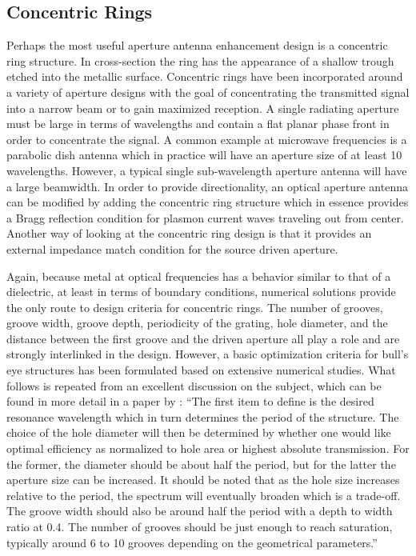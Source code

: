 \documentclass[11pt]{article}
\begin{document}
\subsection{Concentric Rings}
%
Perhaps the most useful aperture antenna enhancement design is a concentric ring structure. In cross-section the ring has the appearance of a shallow trough etched into the metallic surface. Concentric rings have been incorporated around a variety of aperture designs with the goal of concentrating the transmitted signal into a narrow beam or to gain maximized reception. A single radiating aperture must be large in terms of wavelengths and contain a flat planar phase front in order to concentrate the signal. A common example at microwave frequencies is a parabolic dish antenna which in practice will have an aperture size of at least 10 wavelengths. However, a typical single sub-wavelength aperture antenna will have a large beamwidth. In order to provide directionality, an optical aperture antenna can be modified by adding the concentric ring structure which in essence provides a Bragg reflection condition for plasmon current waves traveling out from center. Another way of looking at the concentric ring design is that it provides an external impedance match condition for the source driven aperture.

Again, because metal at optical frequencies has a behavior similar to that of a dielectric, at least in terms of boundary conditions, numerical solutions provide the only route to design criteria for concentric rings. The number of grooves, groove width, groove depth, periodicity of the grating, hole diameter, and the distance between the first groove and the driven aperture all play a role and are strongly interlinked in the design. However, a basic optimization criteria for bull's eye structures has been formulated based on extensive numerical studies. What follows is repeated from an excellent discussion on the subject, which can be found in more detail in a paper by \cite{Mahboub2010}: ``The first item to define is the desired resonance wavelength which in turn determines the period of the structure. The choice of the hole diameter will then be determined by whether one would like optimal efficiency as normalized to hole area or highest absolute transmission. For the former, the diameter should be about half the period, but for the latter the aperture size can be increased. It should be noted that as the hole size increases relative to the period, the spectrum will eventually broaden which is a trade-off. The groove width should also be around half the period with a depth to width ratio at 0.4. The number of grooves should be just enough to reach saturation, typically around 6 to 10 grooves depending on the geometrical parameters.''
\end{document}
